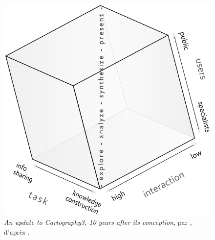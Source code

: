 
\begin{figure}[H]
	\centering
	\vspace{0pt}
	\includegraphics[width=.7\linewidth]{img/cartography3.png}
	\captionsetup{width=.7\linewidth}
	\caption[\og \textit{An update to Cartography3, 10 years after its conception}\fg{}.]{\og \textit{An update to Cartography3, 10 years after its conception}\fg{}, par \textcite{coltekin_geovisualization_2018}, d'après \textcite[10]{maceachren_geovisualization_2004}.}
	\label{fig:cartography3}
\end{figure}

